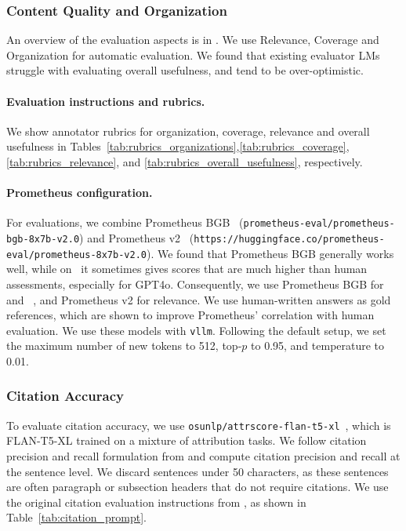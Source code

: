 \subsubsection{Content Quality and Organization}
An overview of the evaluation aspects is in .  
We use Relevance, Coverage and Organization for automatic evaluation. We found that existing evaluator LMs struggle with evaluating overall usefulness, and tend to be over-optimistic. 

\paragraph{Evaluation instructions and rubrics.} 
We show annotator rubrics for organization, coverage, relevance and overall usefulness in Tables~\ref{tab:rubrics_organizations},\ref{tab:rubrics_coverage}, \ref{tab:rubrics_relevance}, and \ref{tab:rubrics_overall_usefulness}, respectively.  

\paragraph{Prometheus configuration.} 
For evaluations, we combine Prometheus BGB~\citep{kim2024biggen} (\texttt{prometheus-eval/prometheus-bgb-8x7b-v2.0}) and Prometheus v2~\citep{kim2024prometheus} (\texttt{https://huggingface.co/prometheus-eval/prometheus-8x7b-v2.0}). 
We found that Prometheus BGB generally works well, while on \rel~it sometimes gives scores that are much higher than human assessments, especially for GPT4o. Consequently, we use Prometheus BGB for \org~ and \cov~, and Prometheus v2 for relevance. 
We use human-written answers as gold references, which are shown to improve Prometheus' correlation with human evaluation. We use these models with \texttt{vllm}. 
Following the default setup, we set the maximum number of new tokens to 512, top-$p$ to 0.95, and temperature to 0.01.  


\subsubsection{Citation Accuracy}
To evaluate citation accuracy, we use \texttt{osunlp/attrscore-flan-t5-xl}~\citep{yue2023automatic}, which is FLAN-T5-XL trained on a mixture of attribution tasks. We follow citation precision and recall formulation from \cite{gao2023enabling} and compute citation precision and recall at the sentence level. We discard sentences under 50 characters, as these sentences are often paragraph or subsection headers that do not require citations. 
We use the original citation evaluation instructions from \citet{yue2023automatic}, as shown in Table~\ref{tab:citation_prompt}.  

